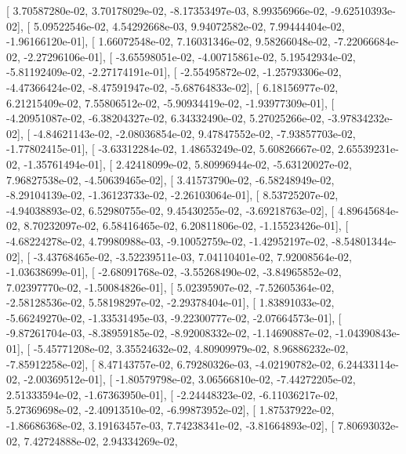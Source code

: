 \documentclass{article}
\begin{document}
       [  3.70587280e-02,   3.70178029e-02,  -8.17353497e-03,
          8.99356966e-02,  -9.62510393e-02],
       [  5.09522546e-02,   4.54292668e-03,   9.94072582e-02,
          7.99444404e-02,  -1.96166120e-01],
       [  1.66072548e-02,   7.16031346e-02,   9.58266048e-02,
         -7.22066684e-02,  -2.27296106e-01],
       [ -3.65598051e-02,  -4.00715861e-02,   5.19542934e-02,
         -5.81192409e-02,  -2.27174191e-01],
       [ -2.55495872e-02,  -1.25793306e-02,  -4.47366424e-02,
         -8.47591947e-02,  -5.68764833e-02],
       [  6.18156977e-02,   6.21215409e-02,   7.55806512e-02,
         -5.90934419e-02,  -1.93977309e-01],
       [ -4.20951087e-02,  -6.38204327e-02,   6.34332490e-02,
          5.27025266e-02,  -3.97834232e-02],
       [ -4.84621143e-02,  -2.08036854e-02,   9.47847552e-02,
         -7.93857703e-02,  -1.77802415e-01],
       [ -3.63312284e-02,   1.48653249e-02,   5.60826667e-02,
          2.65539231e-02,  -1.35761494e-01],
       [  2.42418099e-02,   5.80996944e-02,  -5.63120027e-02,
          7.96827538e-02,  -4.50639465e-02],
       [  3.41573790e-02,  -6.58248949e-02,  -8.29104139e-02,
         -1.36123733e-02,  -2.26103064e-01],
       [  8.53725207e-02,  -4.94038893e-02,   6.52980755e-02,
          9.45430255e-02,  -3.69218763e-02],
       [  4.89645684e-02,   8.70232097e-02,   6.58416465e-02,
          6.20811806e-02,  -1.15523426e-01],
       [ -4.68224278e-02,   4.79980988e-03,  -9.10052759e-02,
         -1.42952197e-02,  -8.54801344e-02],
       [ -3.43768465e-02,  -3.52239511e-03,   7.04110401e-02,
          7.92008564e-02,  -1.03638699e-01],
       [ -2.68091768e-02,  -3.55268490e-02,  -3.84965852e-02,
          7.02397770e-02,  -1.50084826e-01],
       [  5.02395907e-02,  -7.52605364e-02,  -2.58128536e-02,
          5.58198297e-02,  -2.29378404e-01],
       [  1.83891033e-02,  -5.66249270e-02,  -1.33531495e-03,
         -9.22300777e-02,  -2.07664573e-01],
       [ -9.87261704e-03,  -8.38959185e-02,  -8.92008332e-02,
         -1.14690887e-02,  -1.04390843e-01],
       [ -5.45771208e-02,   3.35524632e-02,   4.80909979e-02,
          8.96886232e-02,  -7.85912258e-02],
       [  8.47143757e-02,   6.79280326e-03,  -4.02190782e-02,
          6.24433114e-02,  -2.00369512e-01],
       [ -1.80579798e-02,   3.06566810e-02,  -7.44272205e-02,
          2.51333594e-02,  -1.67363950e-01],
       [ -2.24448323e-02,  -6.11036217e-02,   5.27369698e-02,
         -2.40913510e-02,  -6.99873952e-02],
       [  1.87537922e-02,  -1.86686368e-02,   3.19163457e-03,
          7.74238341e-02,  -3.81664893e-02],
       [  7.80693032e-02,   7.42724888e-02,   2.94334269e-02,
\end{document}
